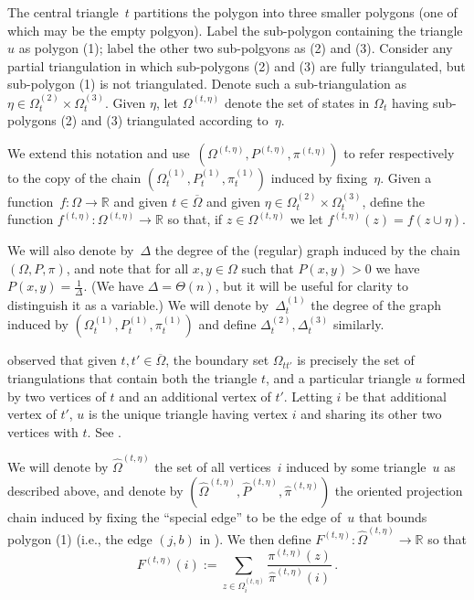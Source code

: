 \documentclass[a4paper, 12p]{article}
\numberwithin{equation}{section}
\newcommand{\FF}{F}
\newcommand{\Omproj}{\overline{\Omega}}
\newcommand{\Omorproj}{\hat{\Omega}}
\newcommand{\Porproj}{\hat{P}}
\newcommand{\piorproj}{\hat{\pi}}
\begin{document}
The central triangle~$t$ partitions the polygon into three smaller polygons (one of which may be the empty polgyon). Label the sub-polygon containing the triangle $u$ as polygon (1); label the other two sub-polgyons as (2) and (3). Consider any partial triangulation in which sub-polygons (2) and (3) are fully triangulated, but sub-polygon (1) is not triangulated. Denote such a sub-triangulation as $\eta \in \Omega_t^{(2)} \times \Omega_t^{(3)}$. Given $\eta$, let $\Omega^{(t, \eta)}$ denote the set of states in $\Omega_t$ having sub-polygons (2) and (3) triangulated according to~$\eta$. 

We extend this notation and use~$\left(\Omega^{(t,\eta)}, P^{(t,\eta)}, \pi^{(t,\eta)}\right)$ to refer respectively to the copy of the chain $\left(\Omega_t^{(1)}, P_t^{(1)}, \pi_t^{(1)}\right)$ induced by fixing~$\eta$. Given a function~$f:\Omega \rightarrow \mathbb{R}$ and given $t \in \Omproj$ and given $\eta \in \Omega_t^{(2)} \times \Omega_t^{(3)}$, define the function $f^{(t,\eta)}: \Omega^{(t,\eta)}\rightarrow \mathbb{R}$ so that, if $z \in \Omega^{(t,\eta)}$ we let $f^{(t,\eta)}(z) = f(z \cup \eta)$.

We will also denote by~$\Delta$ the degree of the (regular) graph induced by the chain  $(\Omega, P, \pi)$, and note that for all $x,y\in\Omega$ such that $P(x, y) > 0$ we have $P(x, y) = \frac{1}{\Delta}$. (We have $\Delta = \Theta(n)$, but it will be useful for clarity to distinguish it as a variable.) We will denote by~$\Delta_t^{(1)}$ the degree of the graph induced by $\left(\Omega_t^{(1)}, P_t^{(1)}, \pi_t^{(1)}\right)$ and define $\Delta_t^{(2)}, \Delta_t^{(3)}$ similarly.

\cite{eppstein2022improved} observed that given $t,t' \in \Omproj$, the boundary set $\Omega_{t t'}$ is precisely the set of triangulations that contain both the triangle $t$, and a particular triangle $u$ formed by two vertices of $t$ and an additional vertex of $t'$.  Letting $i$ be that additional vertex of $t'$, $u$ is the unique triangle having vertex $i$ and sharing its other two vertices with $t$. See . 


We will denote by $\Omorproj^{(t,\eta)}$ the set of all vertices~$i$ induced by some triangle~$u$ as described above, and denote by $\left(\Omorproj^{(t,\eta)}, \Porproj^{(t,\eta)}, \piorproj^{(t,\eta)}\right)$ the oriented projection chain induced by fixing the ``special edge'' to be the edge of~$u$ that bounds polygon (1) (i.e., the edge $(j, b)$ in ).  We then define $\FF^{(t,\eta)}:\Omorproj^{(t,\eta)} \rightarrow \mathbb{R}$ so that 
\[\FF^{(t,\eta)}(i) := \sum_{z \in \Omega_i^{(t,\eta)}}\frac{\pi^{(t,\eta)}(z)}{\piorproj^{(t,\eta)}(i)}\,.\]
\end{document}
